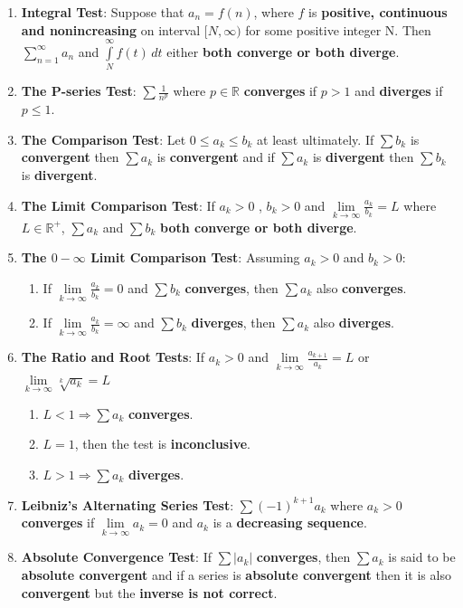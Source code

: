 \documentclass[12pt]{article}
\begin{document}
\begin{small}
\begin{enumerate}
\item \textbf{Integral Test}: Suppose that $a_n = f(n)$, where $f$ is \textbf{positive, continuous and nonincreasing} on interval $[N,\infty)$ for some positive integer N. Then $\sum \limits_{n=1}^\infty a_n$ and $\int \limits_N^\infty f(t)\,dt$ either \textbf{both converge or both diverge}.
\item \textbf{The P-series Test}: $\displaystyle{\sum \frac{1}{n^p}}$ where $p\in \mathbb{R}$ \textbf{converges} if $p>1$ and \textbf{diverges} if $p\leq 1$.
\item \textbf{The Comparison Test}: Let $0\leq a_k \leq b_k$ at least ultimately. If $\sum b_k$ is \textbf{convergent} then $\sum a_k$ is \textbf{convergent} and if $\sum a_k$ is \textbf{divergent} then $\sum b_k$ is \textbf{divergent}.
\item \textbf{The Limit Comparison Test}: If $a_k>0$ , $ b_k>0$ and $\displaystyle{\lim \limits_{k \to \infty} \frac{a_k}{b_k}=L}$ where $L\in \mathbb{R} ^+$, $\sum a_k$ and $\sum b_k $ \textbf{both converge or both diverge}.
\item \textbf{The $0 - \infty$ Limit Comparison Test}: Assuming $a_k>0$ and $b_k>0$:
\begin{enumerate}
\item If $\lim \limits_{k \to \infty} \frac{a_k}{b_k}=0$ and $\sum b_k$ \textbf{converges}, then $\sum a_k$ also \textbf{converges}.
\item If $\lim \limits_{k \to \infty} \frac{a_k}{b_k}=\infty$ and $\sum b_k$ \textbf{diverges}, then $\sum a_k$ also \textbf{diverges}.
\end{enumerate}
\item \textbf{The Ratio and Root Tests}: If $a_k>0$ and $\displaystyle{\lim \limits_{k \to \infty} \frac{a_{k+1}}{a_k}=L}$ or $\displaystyle{\lim \limits_{k \to \infty} \sqrt[k]{a_k}=L}$ 
\begin{enumerate}
\item $L<1 \Rightarrow \sum a_k$ \textbf{converges}.
\item $L=1 $, then the test is \textbf{inconclusive}.
\item $L>1 \Rightarrow \sum a_k$ \textbf{diverges}.
\end{enumerate}
\item \textbf{Leibniz's Alternating Series Test}: $\sum (-1)^{k+1} a_k$ where $a_k>0$ \textbf{converges} if $\lim \limits_{k \to \infty} a_k=0$ and $a_k$ is a \textbf{decreasing sequence}.
\item \textbf{Absolute Convergence Test}: If $\sum |a_k|$ \textbf{converges}, then $\sum a_k$ is said to be \textbf{absolute convergent} and if a series is \textbf{absolute convergent} then it is also \textbf{convergent} but the \textbf{inverse is not correct}.
\end{enumerate}
\end{small}
\end{document}
